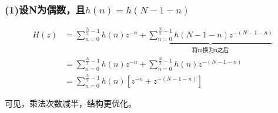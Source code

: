 \documentclass[notheorems,compress,mathserif,table]{beamer}
\begin{document}
\begin{frame}[shrink]\frametitle{(1)设N为偶数，且$h(n)= h(N-1-n)$}%
    \begin{equation*}
        \begin{split}
        H(z)  &= \sum_{n=0}^{\frac{N}{2}-1}h(n)z^{-n}+\underbrace{\sum_{n=0}^{\frac{N}{2}-1}h(N-1-n)z^{-(N-1-n)}}_{\mbox{将m换为n之后}} \\    %
              &= \sum_{n=0}^{\frac{N}{2}-1}h(n)z^{-n}+\sum_{n=0}^{\frac{N}{2}-1}h(n)z^{-(N-1-n)}\\
              &= \sum_{n=0}^{\frac{N}{2}-1}h(n)\left[ z^{-n}+z^{-(N-1-n)}\right]
        \end{split}
    \end{equation*}
    \par 可见，乘法次数减半，结构更优化。
\end{frame}
\end{document}
